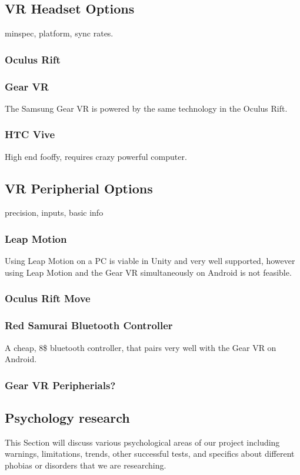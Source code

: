 \documentclass[a4paper,10pt]{article}
\begin{document}
\subsection{VR Headset Options}
minspec, platform, sync rates.
\subsubsection{Oculus Rift}
	
\subsubsection{Gear VR}
	The Samsung Gear VR is powered by the same technology in the Oculus Rift.
\subsubsection{HTC Vive}
	High end fooffy, requires crazy powerful computer.

\subsection{VR Peripherial Options}
precision, inputs, basic info
\subsubsection{Leap Motion}
	Using Leap Motion on a PC is viable in Unity and very well supported, however using Leap Motion and the Gear VR simultaneously on Android is not feasible.
\subsubsection{Oculus Rift Move}
\subsubsection{Red Samurai Bluetooth Controller}
	A cheap, 8\$ bluetooth controller, that pairs very well with the Gear VR on Android.
\subsubsection{Gear VR Peripherials?}
\pagebreak
\subsection {Psychology research}
This Section will discuss various psychological areas of our project including warnings, limitations, trends, other successful tests, and specifics about different phobias or disorders 
that we are researching. 
\end{document}
